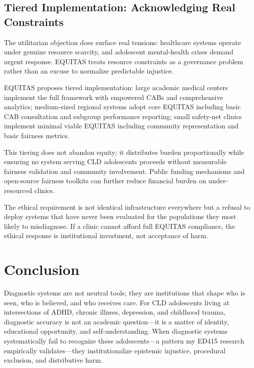 \documentclass[12pt,a4paper]{article}
\begin{document}
\subsection{Tiered Implementation: Acknowledging Real Constraints}

The utilitarian objection does surface real tensions: healthcare systems operate under genuine resource scarcity, and adolescent mental-health crises demand urgent response.\cite{munn_idai700} EQUITAS treats resource constraints as a governance problem rather than an excuse to normalize predictable injustice.

EQUITAS proposes tiered implementation: large academic medical centers implement the full framework with empowered CABs and comprehensive analytics; medium-sized regional systems adopt core EQUITAS including basic CAB consultation and subgroup performance reporting; small safety-net clinics implement minimal viable EQUITAS including community representation and basic fairness metrics.\cite{lekadir2025}

This tiering does not abandon equity; it distributes burden proportionally while ensuring no system serving CLD adolescents proceeds without measurable fairness validation and community involvement.\cite{lekadir2025} Public funding mechanisms and open-source fairness toolkits can further reduce financial burden on under-resourced clinics.\cite{chen2023}

The ethical requirement is not identical infrastructure everywhere but a refusal to deploy systems that have never been evaluated for the populations they most likely to misdiagnose. If a clinic cannot afford full EQUITAS compliance, the ethical response is institutional investment, not acceptance of harm.\cite{garcia_ed415}

\section{Conclusion}

Diagnostic systems are not neutral tools; they are institutions that shape who is seen, who is believed, and who receives care. For CLD adolescents living at intersections of ADHD, chronic illness, depression, and childhood trauma, diagnostic accuracy is not an academic question—it is a matter of identity, educational opportunity, and self-understanding. When diagnostic systems systematically fail to recognize these adolescents—a pattern my ED415 research empirically validates—they institutionalize epistemic injustice, procedural exclusion, and distributive harm.\cite{garcia_ed415}
\end{document}
